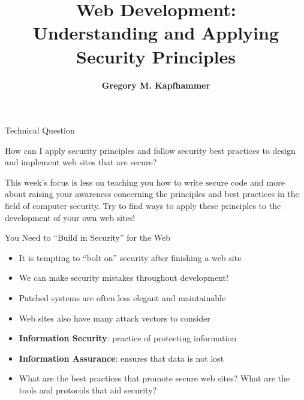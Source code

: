 \documentclass[14pt,aspectratio=169]{beamer}
\title{Web Development: \\ Understanding and Applying\\ Security Principles}
\author{{\bf Gregory M. Kapfhammer}}
\institute[shortinst]{{\bf Department of Computer Science, Allegheny College}}
\begin{document}
{
  \begin{frame}
    \titlepage
  \end{frame}
}

%
\begin{frame}{Technical Question}
  \hspace*{.15in}
  \begin{minipage}{5in}
    \vspace*{.25in}
    \begin{center}
      {\large How can I apply security principles and follow security best
      practices to design and implement web sites that are secure?}
    \end{center}
  \end{minipage}
  \vspace{2ex}
  \begin{center}
    \small This week's focus is less on teaching you how to write secure code
    and more about raising your awareness concerning the principles and best
    practices in the field of computer security. Try to find ways to apply these
    principles to the development of your own web sites! \\
  \end{center}
\end{frame}

%
\begin{frame}{You Need to ``Build in Security'' for the Web}
  \begin{itemize}
    \item It is tempting to ``bolt on'' security after finishing a web site
      \vspace*{-.15in}
    \item We can make security mistakes throughout development!
      \vspace*{-.15in}
    \item Patched systems are often less elegant and maintainable
      \vspace*{-.15in}
    \item Web sites also have many attack vectors to consider
      \vspace*{-.15in}
    \item {\bf Information Security}: practice of protecting information
      \vspace*{-.15in}
    \item {\bf Information Assurance}: ensures that data is not lost
      \vspace*{-.15in}
    \item What are the best practices that promote secure web sites? What are
      the tools and protocols that aid security?
  \end{itemize}
\end{frame}
\end{document}
